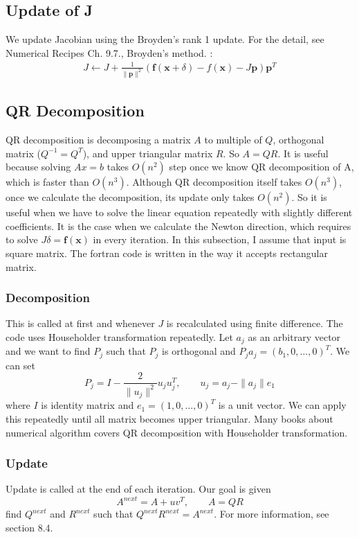 \documentclass[12pt]{article}
\def\xb{{\mathbf{x}}}
\def\fb{{\mathbf{f}}}
\def\pb{{\mathbf{p}}}
\begin{document}
\subsection{Update of J}
We update Jacobian using the Broyden's rank 1 update. For the detail, see Numerical Recipes
Ch. 9.7., Broyden's method.   :
\begin{align*}
  J \leftarrow J +\frac{1}{\|\pb\|^2} (\fb(\xb+\delta)-f(\xb) -J\pb )\pb^T
\end{align*}



\subsection{QR Decomposition}
QR decomposition is decomposing a matrix $A$ to multiple of $Q$, orthogonal matrix ($Q^{-1}=Q^T$),
and upper triangular matrix $R$. So $A=QR$. It is useful because solving $Ax=b$ takes $O(n^2)$
step once we know QR decomposition of A, which is faster than $O(n^3)$. Although QR decomposition
itself takes $O(n^3)$, once we calculate the decomposition, its update only takes $O(n^2)$. So it
is useful when we have to solve the linear equation repeatedly with slightly different
coefficients. It is the case when we calculate the Newton direction, which requires to solve
$J\delta = \fb(\xb)$ in every iteration. In this subsection, I assume that input is square
matrix. The fortran code is written in the way it accepts rectangular matrix.

\subsubsection{Decomposition}
This is called at first and whenever $J$ is recalculated using finite difference.  The code uses
Householder transformation repeatedly. Let $a_j$ as an arbitrary vector and we want to find $P_j$
such that $P_j$ is orthogonal and $P_ja_j = (b_1, 0, \dots,0)^T$. We can set
\[
P_j = I - \frac{2}{\|u_j\|^2} u_ju_j^T, \qquad u_j = a_j - \|a_j\|e_1
\]
where $I$ is identity matrix and $e_1= (1,0,\dots,0)^T$ is a unit vector. We can apply this
repeatedly until all matrix becomes upper triangular. Many books about numerical algorithm covers
QR decomposition with Householder transformation. 




\subsubsection{Update}
Update is called at the end of each iteration. Our goal is given
\[
A^{next} = A + uv^T, \qquad A = QR
\]
find $Q^{next}$ and $R^{next}$ such that $Q^{next}R^{next}=A^{next}$. For more information, see \cite{BjorckDahlquist2008}
section 8.4. 
\end{document}
